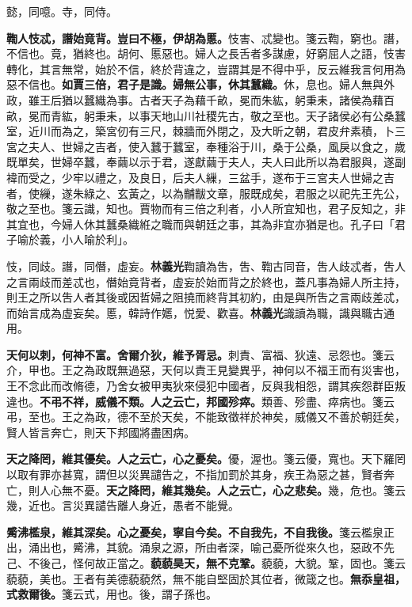 \begin{quoting}懿，同噫。寺，同侍。\end{quoting}

\textbf{鞫人忮忒，譖始竟背。豈曰不極，伊胡為慝。}{\footnotesize 忮害、忒變也。箋云鞫，窮也。譖，不信也。竟，猶終也。胡何、慝惡也。婦人之長舌者多謀慮，好窮屈人之語，忮害轉化，其言無常，始於不信，終於背違之，豈謂其是不得中乎，反云維我言何用為惡不信也。}\textbf{如賈三倍，君子是識。婦無公事，休其蠶織。}{\footnotesize 休，息也。婦人無與外政，雖王后猶以蠶織為事。古者天子為藉千畝，冕而朱紘，躬秉耒，諸侯為藉百畝，冕而青紘，躬秉耒，以事天地山川社稷先古，敬之至也。天子諸侯必有公桑蠶室，近川而為之，築宮仞有三尺，棘牆而外閉之，及大昕之朝，君皮弁素積，卜三宮之夫人、世婦之吉者，使入蠶于蠶室，奉種浴于川，桑于公桑，風戾以食之，歲既單矣，世婦卒蠶，奉繭以示于君，遂獻繭于夫人，夫人曰此所以為君服與，遂副褘而受之，少牢以禮之，及良日，后夫人繅，三盆手，遂布于三宮夫人世婦之吉者，使繅，遂朱綠之、玄黃之，以為黼黻文章，服既成矣，君服之以祀先王先公，敬之至也。箋云識，知也。賈物而有三倍之利者，小人所宜知也，君子反知之，非其宜也，今婦人休其蠶桑織絍之職而與朝廷之事，其為非宜亦猶是也。孔子曰「君子喻於義，小人喻於利」。}

\begin{quoting}忮，同歧。譖，同僭，虛妄。\textbf{林義光}鞫讀為吿，吿、鞫古同音，吿人歧忒者，吿人之言兩歧而差忒也，僭始竟背者，虛妄於始而背之於終也，蓋凡事為婦人所主持，則王之所以吿人者其後或因哲婦之阻撓而終背其初約，由是與所吿之言兩歧差忒，而始言成為虛妄矣。慝，韓詩作嬺，悦愛、歡喜。\textbf{林義光}識讀為職，識與職古通用。\end{quoting}

\textbf{天何以刺，何神不富。舍爾介狄，維予胥忌。}{\footnotesize 刺責、富福、狄遠、忌怨也。箋云介，甲也。王之為政既無過惡，天何以責王見變異乎，神何以不福王而有災害也，王不念此而改脩德，乃舍女被甲夷狄來侵犯中國者，反與我相怨，謂其疾怨群臣叛違也。}\textbf{不弔不祥，威儀不類。人之云亡，邦國殄瘁。}{\footnotesize 類善、殄盡、瘁病也。箋云弔，至也。王之為政，德不至於天矣，不能致徵祥於神矣，威儀又不善於朝廷矣，賢人皆言奔亡，則天下邦國將盡困病。}

\textbf{天之降罔，維其優矣。人之云亡，心之憂矣。}{\footnotesize 優，渥也。箋云優，寬也。天下羅罔以取有罪亦甚寬，謂但以災異譴告之，不指加罰於其身，疾王為惡之甚，賢者奔亡，則人心無不憂。}\textbf{天之降罔，維其幾矣。人之云亡，心之悲矣。}{\footnotesize 幾，危也。箋云幾，近也。言災異譴告離人身近，愚者不能覺。}

\textbf{觱沸檻泉，維其深矣。心之憂矣，寧自今矣。不自我先，不自我後。}{\footnotesize 箋云檻泉正出，涌出也，觱沸，其貌。涌泉之源，所由者深，喻己憂所從來久也，惡政不先己、不後己，怪何故正當之。}\textbf{藐藐昊天，無不克鞏。}{\footnotesize 藐藐，大貌。鞏，固也。箋云藐藐，美也。王者有美德藐藐然，無不能自堅固於其位者，微箴之也。}\textbf{無忝皇祖，式救爾後。}{\footnotesize 箋云式，用也。後，謂子孫也。}

